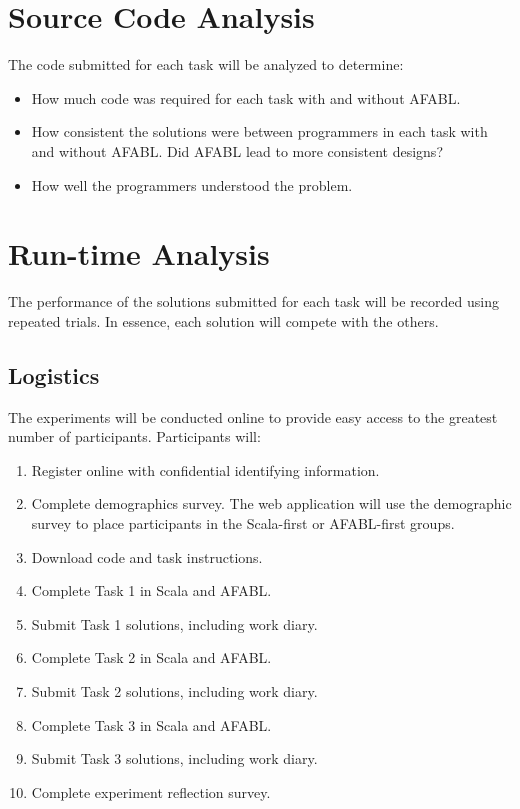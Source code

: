 \begin{appendices}
\section{Source Code Analysis}

The code submitted for each task will be analyzed to determine:

\begin{itemize}
\item How much code was required for each task with and without AFABL.
\item How consistent the solutions were between programmers in each task with and without AFABL.  Did AFABL lead to more consistent designs?
\item How well the programmers understood the problem.
\end{itemize}

\section{Run-time Analysis}

The performance of the solutions submitted for each task will be recorded using repeated trials.  In essence, each solution will compete with the others.

\subsection{Logistics}

The experiments will be conducted online to provide easy access to the greatest number of participants.  Participants will:

\begin{enumerate}
\item Register online with confidential identifying information.
\item Complete demographics survey.  The web application will use the demographic survey to place participants in the Scala-first or AFABL-first groups.
\item Download code and task instructions.
\item Complete Task 1 in Scala and AFABL.
\item Submit Task 1 solutions, including work diary.
\item Complete Task 2 in Scala and AFABL.
\item Submit Task 2 solutions, including work diary.
\item Complete Task 3 in Scala and AFABL.
\item Submit Task 3 solutions, including work diary.
\item Complete experiment reflection survey.
\end{enumerate}


\end{appendices}
